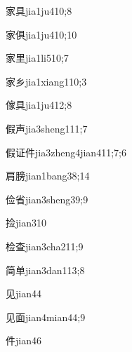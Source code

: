 \begin{verbete}{家具}{jia1ju4}{10;8}
\end{verbete}
\begin{verbete}{家俱}{jia1ju4}{10;10}
\end{verbete}
\begin{verbete}{家里}{jia1li5}{10;7}
\end{verbete}
\begin{verbete}{家乡}{jia1xiang1}{10;3}
\end{verbete}
\begin{verbete}{傢具}{jia1ju4}{12;8}
\end{verbete}
\begin{verbete}{假声}{jia3sheng1}{11;7}
\end{verbete}
\begin{verbete}{假证件}{jia3zheng4jian4}{11;7;6}
\end{verbete}
\begin{verbete}{肩膀}{jian1bang3}{8;14}
\end{verbete}
\begin{verbete}{俭省}{jian3sheng3}{9;9}
\end{verbete}
\begin{verbete}{捡}{jian3}{10}
\end{verbete}
\begin{verbete}{检查}{jian3cha2}{11;9}
\end{verbete}
\begin{verbete}{简单}{jian3dan1}{13;8}
\end{verbete}
\begin{verbete}{见}{jian4}{4}
\end{verbete}
\begin{verbete}{见面}{jian4mian4}{4;9}
\end{verbete}
\begin{verbete}{件}{jian4}{6}
\end{verbete}
